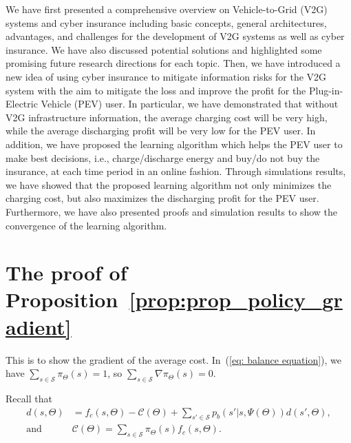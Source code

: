 \documentclass[twocolumn,10pt]{IEEEtran}
\begin{document}
We have first presented a comprehensive overview on Vehicle-to-Grid (V2G) systems and cyber insurance including basic concepts, general architectures, advantages, and challenges for the development of V2G systems as well as cyber insurance. We have also discussed potential solutions and highlighted some promising future research directions for each topic. Then, we have introduced a new idea of using cyber insurance to mitigate information risks for the V2G system with the aim to mitigate the loss and improve the profit for the Plug-in-Electric Vehicle (PEV) user. In particular, we have demonstrated that without V2G infrastructure information, the average charging cost will be very high, while the average discharging profit will be very low for the PEV user. In addition, we have proposed the learning algorithm which helps the PEV user to make best decisions, i.e., charge/discharge energy and buy/do not buy the insurance, at each time period in an online fashion. Through simulations results, we have showed that the proposed learning algorithm not only minimizes the charging cost, but also maximizes the discharging profit for the PEV user. Furthermore, we have also presented proofs and simulation results to show the convergence of the learning algorithm. 




\appendices

\section{The proof of Proposition~\ref{prop:prop_policy_gradient}}
\label{appendix:prop:prop_policy_gradient}

This is to show the gradient of the average cost. In~(\ref{eq: balance equation}), we have $\sum_{s \in \mathcal{S}} \pi_{\Theta}({s})  = 1$, so $\sum_{s \in \mathcal{S}} \nabla \pi_{\Theta}({s})  = 0$. 

Recall that 
\begin{displaymath}
\begin{aligned}
d(s, \Theta)  & = f_c (s, \Theta) - \mathcal{C} (\Theta) + \sum_{s' \in \mathcal{S}} p_b (s'|s,\Psi(\Theta)) d(s', \Theta) ,	\\
\text{and} \phantom{5} & \mathcal{C} (\Theta) = \sum_{s \in \mathcal{S}} \pi_{\Theta}({s}) f_c (s, \Theta).
\end{aligned}
\end{displaymath}
\end{document}
